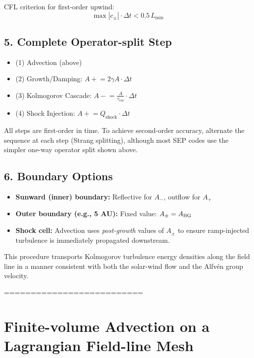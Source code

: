 CFL criterion for first-order upwind:
\[
\max |c_\pm| \cdot \Delta t < 0.5 \, L_{\min}
\]

\subsection*{5. Complete Operator-split Step}
\begin{itemize}
    \item (1) Advection (above)
    \item (2) Growth/Damping: \quad $A \mathrel{+}= 2\gamma A \cdot \Delta t$
    \item (3) Kolmogorov Cascade: \quad $A \mathrel{-}= \frac{A}{\tau_{\text{cas}}} \cdot \Delta t$
    \item (4) Shock Injection: \quad $A \mathrel{+}= Q_{\text{shock}} \cdot \Delta t$
\end{itemize}

All steps are first-order in time. To achieve second-order accuracy, alternate the sequence at each step (Strang splitting), although most SEP codes use the simpler one-way operator split shown above.

\subsection*{6. Boundary Options}

\begin{itemize}
    \item \textbf{Sunward (inner) boundary:} Reflective for $A_-$, outflow for $A_+$
    \item \textbf{Outer boundary (e.g., 5 AU):} Fixed value: $A_\pm = A_{\rm BG}$
    \item \textbf{Shock cell:} Advection uses \emph{post-growth} values of $A_\pm$ to ensure ramp-injected turbulence is immediately propagated downstream.
\end{itemize}

\medskip

\noindent
This procedure transports Kolmogorov turbulence energy densities along the field line in a manner consistent with both the solar-wind flow and the Alfvén group velocity.


==========================


\section*{Finite-volume Advection on a Lagrangian Field-line Mesh}

